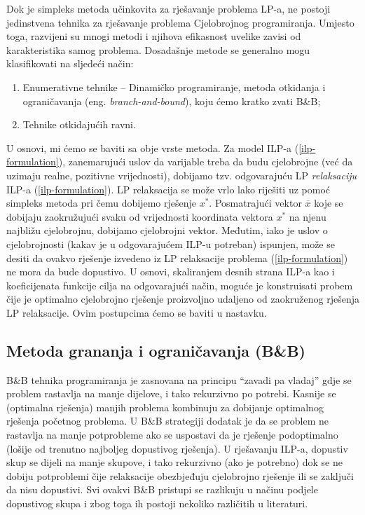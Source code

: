 \documentclass[a4paper, utf8, 11pt, colorlinks]{article}
\begin{document}
 Dok je simpleks metoda učinkovita za rješavanje  problema LP-a, ne postoji jedinstvena tehnika za rješavanje problema Cjelobrojnog programiranja. Umjesto toga, razvijeni su mnogi metodi i njihova efikasnost
 uvelike zavisi od karakteristika samog problema. Dosadašnje metode se generalno mogu klasifikovati na sljedeći način:
 \begin{enumerate}
     \item Enumerativne tehnike -- Dinamičko programiranje, metoda otkidanja i ograničavanja (eng. \emph{branch-and-bound}), koju ćemo kratko zvati B\&B;
     \item Tehnike otkidajućih ravni.
 \end{enumerate}

U osnovi, mi ćemo se baviti sa obje vrste metoda. Za model ILP-a (\ref{ilp-formulation}), zanemarujući uslov da varijable treba da budu cjelobrojne (već da uzimaju realne, pozitivne vrijednosti), dobijamo tzv. odgovarajuću LP \emph{relaksaciju} ILP-a (\ref{ilp-formulation}). LP relaksacija se može vrlo lako riješiti uz pomoć simpleks metoda pri čemu dobijemo rješenje $x^*$. Posmatrajući vektor $\overline{x}$ koje se dobijaju zaokružujući svaku od vrijednosti koordinata vektora $x^*$ na njenu najbližu cjelobrojnu, dobijamo cjelobrojni vektor. Međutim, iako je uslov o cjelobrojnosti (kakav je u odgovarajućem ILP-u potreban) ispunjen, može se desiti da ovakvo rješenje izvedeno iz LP relaksacije problema (\ref{ilp-formulation}) ne mora da bude dopustivo. U osnovi, skaliranjem desnih strana ILP-a kao i koeficijenata funkcije cilja na odgovarajući način, moguće je konstruisati probem čije je optimalno cjelobrojno rješenje proizvoljno udaljeno od zaokruženog rješenja LP relaksacije. Ovim postupcima ćemo se baviti u nastavku. 

\subsection{Metoda grananja i ograničavanja (B\&B)}
B\&B tehnika programiranja je zasnovana na principu ``zavadi pa vladaj'' gdje se problem rastavlja na manje dijelove, i tako rekurzivno po potrebi. Kasnije se (optimalna rješenja) manjih problema kombinuju za dobijanje optimalnog rješenja početnog problema.  U B\&B strategiji dodatak je da se 
problem ne rastavlja na manje potprobleme ako se uspostavi da je rješenje podoptimalno (lošije od trenutno najboljeg dopustivog rješenja). U rješavanju ILP-a, dopustiv skup se dijeli na manje skupove, i tako rekurzivno (ako je potrebno) dok se ne dobiju potproblemi čije relaksacije obezbjeđuju cjelobrojno rješenje ili se zaključi da nisu dopustivi. Svi ovakvi B\&B pristupi se razlikuju u načinu podjele dopustivog skupa i zbog toga ih postoji nekoliko različitih u literaturi. 
\end{document}

